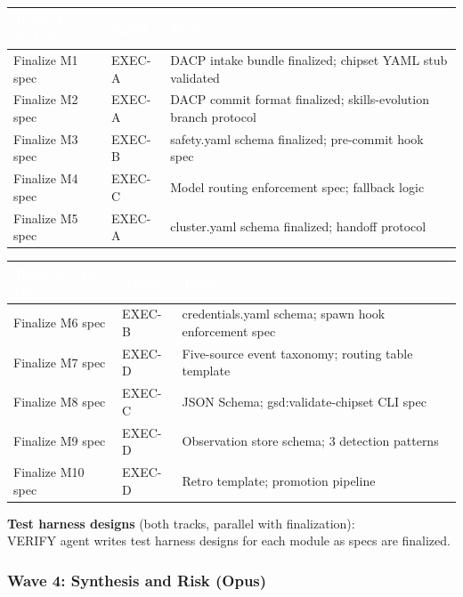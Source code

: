 \documentclass[11pt,letterpaper]{article}
\newcommand{\tableheader}[1]{\textbf{\sffamily\textcolor{white}{#1}}}
\begin{document}
\begin{center}
\begin{tabularx}{\textwidth}{L{3.5cm}L{2cm}X}
\toprule
{}
\tableheader{Track A (M1-5)} & \tableheader{Agent} & \tableheader{Tasks} \\
\midrule
Finalize M1 spec & EXEC-A & DACP intake bundle finalized; chipset YAML stub validated \\
Finalize M2 spec & EXEC-A & DACP commit format finalized; skills-evolution branch protocol \\
Finalize M3 spec & EXEC-B & safety.yaml schema finalized; pre-commit hook spec \\
Finalize M4 spec & EXEC-C & Model routing enforcement spec; fallback logic \\
Finalize M5 spec & EXEC-A & cluster.yaml schema finalized; handoff protocol \\
\end{tabularx}
\end{center}

\begin{center}
\begin{tabularx}{\textwidth}{L{3.5cm}L{2cm}X}
\toprule
{}
\tableheader{Track B (M6-10)} & \tableheader{Agent} & \tableheader{Tasks} \\
\midrule
Finalize M6 spec & EXEC-B & credentials.yaml schema; spawn hook enforcement spec \\
Finalize M7 spec & EXEC-D & Five-source event taxonomy; routing table template \\
Finalize M8 spec & EXEC-C & JSON Schema; gsd:validate-chipset CLI spec \\
Finalize M9 spec & EXEC-D & Observation store schema; 3 detection patterns \\
Finalize M10 spec & EXEC-D & Retro template; promotion pipeline \\
\end{tabularx}
\end{center}

\textbf{Test harness designs} (both tracks, parallel with finalization):\\
VERIFY agent writes test harness designs for each module as specs are finalized.

\subsubsection{Wave 4: Synthesis and Risk (Opus)}
\end{document}

